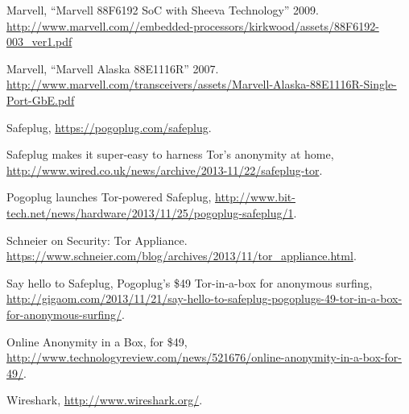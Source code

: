 \begin{thebibliography}{99}

 Marvell, ``Marvell 88F6192 SoC with Sheeva Technology'' 2009. \url{http://www.marvell.com//embedded-processors/kirkwood/assets/88F6192-003_ver1.pdf}

 Marvell, ``Marvell Alaska 88E1116R'' 2007. \url{http://www.marvell.com/transceivers/assets/Marvell-Alaska-88E1116R-Single-Port-GbE.pdf}

 Safeplug, \url{https://pogoplug.com/safeplug}.

 Safeplug makes it super-easy to harness Tor's anonymity at home, \url{http://www.wired.co.uk/news/archive/2013-11/22/safeplug-tor}.

 Pogoplug launches Tor-powered Safeplug, \url{http://www.bit-tech.net/news/hardware/2013/11/25/pogoplug-safeplug/1}.

 Schneier on Security: Tor Appliance.  \url{https://www.schneier.com/blog/archives/2013/11/tor_appliance.html}.

 Say hello to Safeplug, Pogoplug’s \$49 Tor-in-a-box for anonymous surfing, \url{http://gigaom.com/2013/11/21/say-hello-to-safeplug-pogoplugs-49-tor-in-a-box-for-anonymous-surfing/}.

 Online Anonymity in a Box, for \$49, \url{http://www.technologyreview.com/news/521676/online-anonymity-in-a-box-for-49/}.

 Wireshark, \url{http://www.wireshark.org/}. 

\end{thebibliography}

